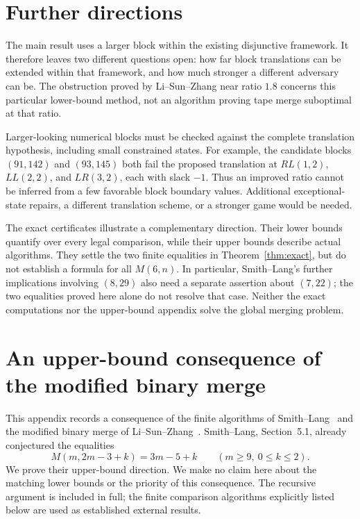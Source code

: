 \documentclass[11pt]{article}
\theoremstyle{definition}
\theoremstyle{remark}
\begin{document}
\section{Further directions}
The main result uses a larger block within the existing disjunctive
framework. It therefore leaves two different questions open: how far
block translations can be extended within that framework, and how much
stronger a different adversary can be. The obstruction proved by
Li--Sun--Zhang near ratio $1.8$ concerns this particular lower-bound
method, not an algorithm proving tape merge suboptimal at that ratio.

Larger-looking numerical blocks must be checked against the complete
translation hypothesis, including small constrained states. For example,
the candidate blocks $(91,142)$ and $(93,145)$ both fail the proposed
translation at $RL(1,2)$, $LL(2,2)$, and $LR(3,2)$, each with slack $-1$.
Thus an improved ratio cannot be inferred from a few favorable block
boundary values. Additional exceptional-state repairs, a different
translation scheme, or a stronger game would be needed.

The exact certificates illustrate a complementary direction. Their lower
bounds quantify over every legal comparison, while their upper bounds
describe actual algorithms. They settle the two finite equalities in
Theorem~\ref{thm:exact}, but do not establish a formula for all $M(6,n)$.
In particular, Smith--Lang's further implications involving $(8,29)$ also
need a separate assertion about $(7,22)$; the two equalities proved here
alone do not resolve that case. Neither the exact computations nor the
upper-bound appendix solve the global merging problem.

\appendix


\section{An upper-bound consequence of the modified binary merge}
\label{app:upper-consequence}

This appendix records a consequence of the finite algorithms of
Smith--Lang~\cite{smithlang} and the modified binary merge of
Li--Sun--Zhang~\cite{lsz2016}.  Smith--Lang, Section~5.1, already
conjectured the equalities
\[
 M(m,2m-3+k)=3m-5+k\qquad(m\ge9,\ 0\le k\le2).
\]
We prove their upper-bound direction.  We make no claim here about the
matching lower bounds or the priority of this consequence.  The recursive
argument is included in full; the finite comparison algorithms explicitly
listed below are used as established external results.
\end{document}
